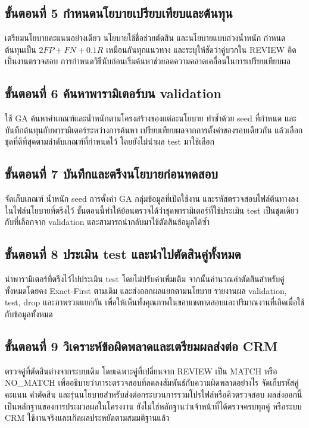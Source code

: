 \subsection*{ขั้นตอนที่ 5 กำหนดนโยบายเปรียบเทียบและต้นทุน}
เตรียมนโยบายคะแนนอย่างเดียว นโยบายใช้ชื่อช่วยตัดสิน และนโยบายแบบถ่วงน้ำหนัก กำหนดต้นทุนเป็น $2FP+FN+0.1R$ เหมือนกันทุกแนวทาง และระบุให้ชัดว่าคู่บวกใน REVIEW คิดเป็นงานตรวจสอบ การกำหนดวิธีนับก่อนเริ่มค้นหาช่วยลดความคลาดเคลื่อนในการเปรียบเทียบผล

\subsection*{ขั้นตอนที่ 6 ค้นหาพารามิเตอร์บน validation}
ใช้ GA ค้นหาค่าเกณฑ์และน้ำหนักตามโครงสร้างของแต่ละนโยบาย ทำซ้ำด้วย seed ที่กำหนด และบันทึกต้นทุนกับพารามิเตอร์ระหว่างการค้นหา เปรียบเทียบผลจากการตั้งค่าของรอบเดียวกัน แล้วเลือกชุดที่ดีที่สุดตามลำดับเกณฑ์ที่กำหนดไว้ โดยยังไม่นำผล test มาใช้เลือก

\subsection*{ขั้นตอนที่ 7 บันทึกและตรึงนโยบายก่อนทดสอบ}
จัดเก็บเกณฑ์ น้ำหนัก seed การตั้งค่า GA กลุ่มข้อมูลที่เปิดใช้งาน และรหัสตรวจสอบไฟล์ต้นทางลงในไฟล์นโยบายที่ตรึงไว้ ขั้นตอนนี้ทำให้ย้อนตรวจได้ว่าชุดพารามิเตอร์ที่ใช้ประเมิน test เป็นชุดเดียวกับที่เลือกจาก validation และสามารถนำกลับมาใช้ตัดสินข้อมูลได้ซ้ำ

\subsection*{ขั้นตอนที่ 8 ประเมิน test และนำไปตัดสินคู่ทั้งหมด}
นำพารามิเตอร์ที่ตรึงไว้ไปประเมิน test โดยไม่ปรับค่าเพิ่มเติม จากนั้นคำนวณคำตัดสินสำหรับคู่ทั้งหมดโดยคง Exact-First ตามเดิม และส่งออกผลแยกตามนโยบาย รายงานผล validation, test, drop และภาพรวมแยกกัน เพื่อให้เห็นทั้งคุณภาพในขอบเขตทดสอบและปริมาณงานที่เกิดเมื่อใช้กับข้อมูลทั้งหมด

\subsection*{ขั้นตอนที่ 9 วิเคราะห์ข้อผิดพลาดและเตรียมผลส่งต่อ CRM}
ตรวจคู่ที่ตัดสินต่างจากระบบเดิม โดยเฉพาะคู่ที่เปลี่ยนจาก REVIEW เป็น MATCH หรือ NO\_MATCH เพื่ออธิบายว่าภาระตรวจสอบที่ลดลงสัมพันธ์กับความผิดพลาดอย่างไร จัดเก็บรหัสคู่ คะแนน คำตัดสิน และรุ่นนโยบายสำหรับส่งต่อกระบวนการรวมโปรไฟล์หรือคิวตรวจสอบ ผลส่งออกนี้เป็นหลักฐานของการประมวลผลในโครงงาน ยังไม่ใช่หลักฐานว่าเจ้าหน้าที่ได้ตรวจครบทุกคู่ หรือระบบ CRM ใช้งานจริงและเกิดผลประหยัดตามสมมติฐานแล้ว

